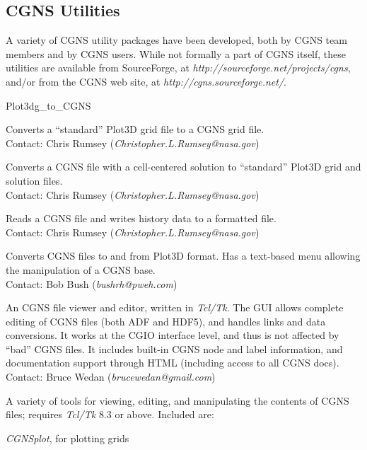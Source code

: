\newpage
\subsection{CGNS Utilities}

A variety of CGNS utility packages have been developed, both by CGNS
team members and by CGNS users.
While not formally a part of CGNS itself, these utilities are available
from SourceForge, at \textit{http://sourceforge.net/projects/cgns},
and/or from the CGNS web site, at \textit{http://cgns.sourceforge.net/}.

\begin{Ventryi}{Plot3dg\_to\_CGNS}
\item [Plot3dg\_to\_CGNS]
      Converts a ``standard'' Plot3D grid file to a CGNS grid file.\\
      Contact: Chris Rumsey (\textit{Christopher.L.Rumsey@nasa.gov})
\item [CGNS\_to\_Plot3d]
      Converts a CGNS file with a cell-centered solution to ``standard''
      Plot3D grid and solution files.\\
      Contact: Chris Rumsey (\textit{Christopher.L.Rumsey@nasa.gov})
\item [CGNS\_readhist]
      Reads a CGNS file and writes history data to a formatted file.\\
      Contact: Chris Rumsey (\textit{Christopher.L.Rumsey@nasa.gov})
\item [FTU]
      Converts CGNS files to and from Plot3D format.
      Has a text-based menu allowing the manipulation of a CGNS base.\\
      Contact: Bob Bush (\textit{bushrh@pweh.com})
\item [CGNSview]
      An CGNS file viewer and editor, written in \textit{Tcl/Tk}.
      The GUI allows complete editing of CGNS files (both ADF and HDF5),
      and handles links and data conversions. It works at the CGIO
      interface level, and thus is not affected by ``bad'' CGNS files.
      It includes built-in CGNS node and label information, and
      documentation support through HTML (including access to all
      CGNS docs).\\
      Contact: Bruce Wedan (\textit{brucewedan@gmail.com})
\item [CGNS Tools]
      A variety of tools for viewing, editing, and manipulating the
      contents of CGNS files; requires \textit{Tcl/Tk} 8.3 or above.
      Included are:
      \begin{itemize*}
      \item \textit{CGNSplot}, for plotting grids

\end{itemize*}
\end{Ventryi}
